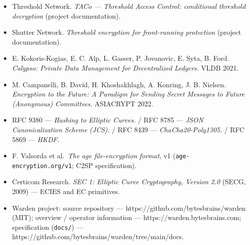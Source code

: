 \documentclass[
  11pt,
]{article}
\begin{document}
\begin{itemize}
  \emph{Witness Encryption from SNARKs / KZG.} IACR ePrint 2025/1364
  (CRYPTO 2025).
\item
  Threshold Network. \emph{TACo --- Threshold Access Control:
  conditional threshold decryption} (project documentation).
\item
  Shutter Network. \emph{Threshold encryption for front-running
  protection} (project documentation).
\item
  E. Kokoris-Kogias, E. C. Alp, L. Gasser, P. Jovanovic, E. Syta, B.
  Ford. \emph{Calypso: Private Data Management for Decentralized
  Ledgers.} VLDB 2021.
\item
  M. Campanelli, B. David, H. Khoshakhlagh, A. Konring, J. B. Nielsen.
  \emph{Encryption to the Future: A Paradigm for Sending Secret Messages
  to Future (Anonymous) Committees.} ASIACRYPT 2022.
\item
  RFC 9380 --- \emph{Hashing to Elliptic Curves.} / RFC 8785 ---
  \emph{JSON Canonicalization Scheme (JCS).} / RFC 8439 ---
  \emph{ChaCha20-Poly1305.} / RFC 5869 --- \emph{HKDF.}
\item
  F. Valsorda et al.~\emph{The age file-encryption format}, v1
  (\texttt{age-encryption.org/v1}; C2SP specification).
\item
  Certicom Research. \emph{SEC 1: Elliptic Curve Cryptography, Version
  2.0} (SECG, 2009) --- ECIES and EC primitives.
\item
  Warden project: source repository ---
  https://github.com/bytesbrains/warden (MIT); overview / operator
  information --- https://warden.bytesbrains.com; specification
  (\texttt{docs/}) ---
  https://github.com/bytesbrains/warden/tree/main/docs.
\end{itemize}
\end{document}
